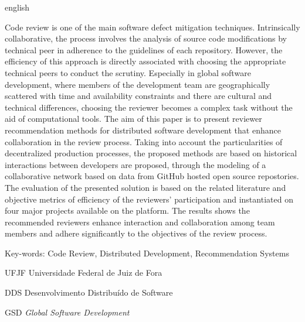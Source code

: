 \documentclass[12pt,openany,oneside,a4paper,english,brazil]{abntbibufjf}
\begin{document}
\begin{resumo}[ABSTRACT]
 \begin{otherlanguage*}{english}

Code review is one of the main software defect mitigation techniques. Intrinsically collaborative, the process involves the analysis of source code modifications by technical peer in adherence to the guidelines of each repository. However, the efficiency of this approach is directly associated with choosing the appropriate technical peers to conduct the scrutiny. Especially in global software development, where members of the development team are geographically scattered with time and availability constraints and there are cultural and technical differences, choosing the reviewer becomes a complex task without the aid of computational tools. The aim of this paper is to present reviewer recommendation methods for distributed software development that enhance collaboration in the review process. Taking into account the particularities of decentralized production processes, the proposed  methods are based on historical interactions between developers are proposed, through the modeling of a collaborative network based on data from GitHub hosted open source repostories. The evaluation of the presented solution is based on the related literature and objective metrics of efficiency of the reviewers' participation and instantiated on four major projects available on the platform. The results shows the recommended reviewers enhance interaction and collaboration among team members and adhere significantly to the objectives of the review process.

Key-words: Code Review, Distributed Development, Recommendation Systems
 \end{otherlanguage*}
\end{resumo}


\listoffigures*
\cleardoublepage


 \listoftables*
 \cleardoublepage

\begin{siglas} %
  \item[UFJF] Universidade Federal de Juiz de Fora
  \item[DDS]  Desenvolvimento Distribuído de Software
  \item[GSD] \textit{Global Software Development}
\end{siglas}
\end{document}
